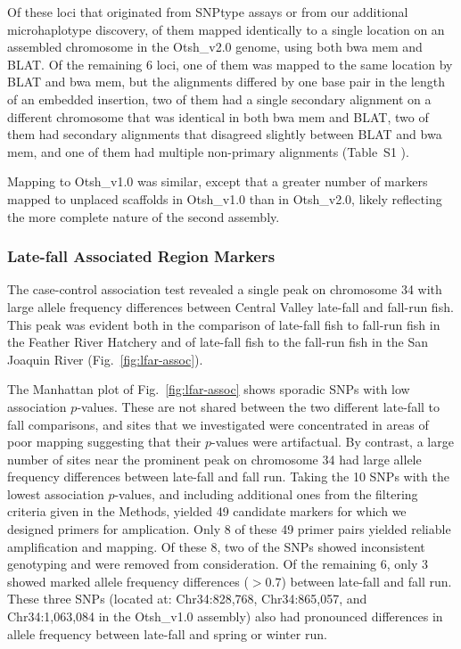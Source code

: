 Of these  loci that originated from SNPtype assays or from our additional
microhaplotype discovery,  of them mapped identically to a single
location on an assembled chromosome in the Otsh\_v2.0 genome, using both bwa mem and BLAT.
Of the remaining 6 loci, one of them was mapped to the same location by BLAT and bwa mem, but
the alignments differed by one base pair in the length of an embedded insertion, two of them had a single secondary alignment on a different chromosome
that was identical in both bwa mem and BLAT, two of them had secondary alignments that
disagreed slightly between BLAT and bwa mem, and one of them had multiple
non-primary alignments (Table~S1 ).

Mapping to Otsh\_v1.0 was similar, except that a greater number of markers mapped to unplaced
scaffolds in Otsh\_v1.0 than in Otsh\_v2.0, likely reflecting the more complete nature of the
second assembly.  

\subsubsection*{Late-fall Associated Region Markers}

The case-control association test revealed a single peak on chromosome 34 with large allele frequency differences
between Central Valley late-fall and fall-run fish.  This peak was evident both in the comparison of
late-fall fish to fall-run fish in the Feather River Hatchery and of late-fall fish to the fall-run fish in
the San Joaquin River (Fig.~\ref{fig:lfar-assoc}).




The Manhattan plot of Fig.~\ref{fig:lfar-assoc} shows sporadic SNPs with low association
$p$-values.  These are not shared between the two different late-fall to fall comparisons, and
sites that we investigated were concentrated in areas of poor mapping suggesting that their
$p$-values were artifactual.  By contrast, a large number of sites near the prominent peak on
chromosome 34 had large allele frequency differences between late-fall and fall run.  Taking the
10 SNPs with the lowest association $p$-values, and including additional ones from the filtering criteria given in the
Methods, yielded 49 candidate markers for which we designed primers for amplication.  Only 8
of these 49 primer pairs yielded reliable amplification and mapping.   Of these 8, two of the SNPs 
showed inconsistent genotyping and were removed from consideration.  Of the remaining 6, only 3 
showed marked allele frequency differences ($> 0.7$) between late-fall and fall run.  These three 
SNPs (located at: Chr34:828,768,  Chr34:865,057, and Chr34:1,063,084 in the Otsh\_v1.0 assembly)
also had pronounced differences in allele frequency between 
late-fall and spring or winter run.

